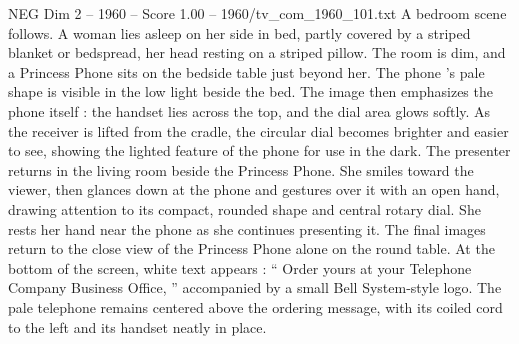 \begin{textsample}{NEG Dim 2 – 1960 – Score 1.00 – 1960/tv\_com\_1960\_101.txt}
A bedroom scene follows.
A woman lies asleep on her side in bed, partly covered by a striped blanket or bedspread, her head resting on a striped pillow.
The room is dim, and a Princess Phone sits on the bedside table just beyond her.
The phone ’s pale shape is visible in the low light beside the bed.
The image then emphasizes the phone itself : the handset lies across the top, and the dial area glows softly.
As the receiver is lifted from the cradle, the circular dial becomes brighter and easier to see, showing the lighted feature of the phone for use in the dark.
The presenter returns in the living room beside the Princess Phone.
She smiles toward the viewer, then glances down at the phone and gestures over it with an open hand, drawing attention to its compact, rounded shape and central rotary dial.
She rests her hand near the phone as she continues presenting it.
The final images return to the close view of the Princess Phone alone on the round table.
At the bottom of the screen, white text appears : “ Order yours at your Telephone Company Business Office, ” accompanied by a small Bell System-style logo.
The pale telephone remains centered above the ordering message, with its coiled cord to the left and its handset neatly in place.

\end{textsample}
